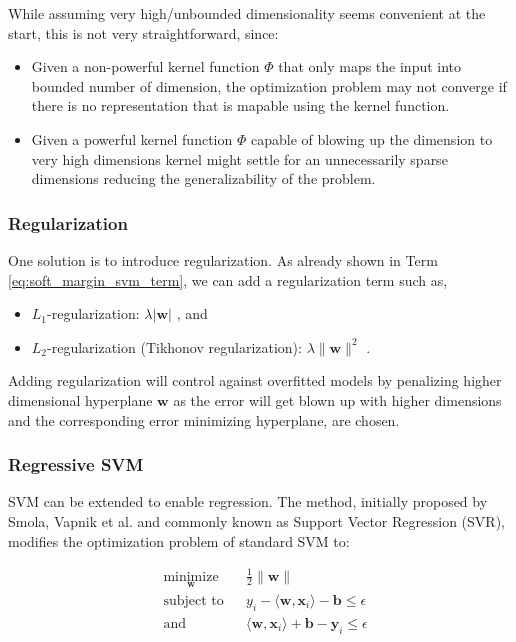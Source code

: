 \documentclass[pdftex,12pt,a4paper]{report}
\begin{document}
While assuming very high/unbounded dimensionality seems convenient at the start, this is not very straightforward, since:

\begin{itemize}
\item Given a non-powerful kernel function $\Phi$ that only maps the input into bounded number of dimension, the optimization problem may not converge if there is no representation that is mapable  using the kernel function.
\item Given a powerful kernel function $\Phi$ capable of blowing up the dimension to very high dimensions kernel might settle for an unnecessarily sparse dimensions reducing the generalizability of the problem.
\end{itemize}

\subsubsection*{Regularization}

One solution is to introduce regularization. As already shown in Term \ref{eq:soft_margin_svm_term}, we can add a regularization term such as, 

\begin{itemize}
\item $L_1$-regularization: $\lambda \vert \mathbf{w} \vert$ \cite{park2007l1}, and
\item $L_2$-regularization (Tikhonov regularization): $\lambda \| \mathbf{w} \|^2$ \cite{tikhonov1977solutions}.
\end{itemize}

Adding regularization will control against overfitted models by penalizing higher dimensional hyperplane $\mathbf{w}$ as the error will get blown up with higher dimensions and the corresponding error minimizing hyperplane, are chosen.

\subsubsection*{Regressive SVM}

SVM can be extended to enable regression. The method, initially proposed by Smola, Vapnik et al. \cite{drucker1997support} and commonly known as Support Vector Regression (SVR), modifies the optimization problem of standard SVM to:

\begin{equation*}
\begin{aligned}
& \underset{\mathbf{
w}}{\text{minimize}}
& & \frac{1}{2} \| \mathbf{w} \| \\
& \text{subject to}
& & y_i - \langle \mathbf{w} , \mathbf{x}_i \rangle - \mathbf{b} \leq \epsilon \\
& \text{and} && \langle \mathbf{w} , \mathbf{x}_i\rangle + \mathbf{b} - \mathbf{y}_i \leq \epsilon \\
\end{aligned}
\end{equation*}
\end{document}
